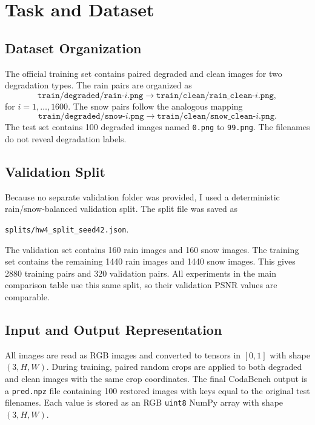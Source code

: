 \documentclass[10pt,conference]{article}
\begin{document}
\section{Task and Dataset}

\subsection{Dataset Organization}

The official training set contains paired degraded and clean images for two degradation types. The rain pairs are organized as
\begin{equation}
    \texttt{train/degraded/rain-}i\texttt{.png} \rightarrow \texttt{train/clean/rain\_clean-}i\texttt{.png},
\end{equation}
for $i=1,\ldots,1600$. The snow pairs follow the analogous mapping
\begin{equation}
    \texttt{train/degraded/snow-}i\texttt{.png} \rightarrow \texttt{train/clean/snow\_clean-}i\texttt{.png}.
\end{equation}
The test set contains 100 degraded images named \texttt{0.png} to \texttt{99.png}. The filenames do not reveal degradation labels.

\subsection{Validation Split}

Because no separate validation folder was provided, I used a deterministic rain/snow-balanced validation split. The split file was saved as
\begin{center}
\texttt{splits/hw4\_split\_seed42.json}.
\end{center}
The validation set contains 160 rain images and 160 snow images. The training set contains the remaining 1440 rain images and 1440 snow images. This gives 2880 training pairs and 320 validation pairs. All experiments in the main comparison table use this same split, so their validation PSNR values are comparable.

\subsection{Input and Output Representation}

All images are read as RGB images and converted to tensors in $[0,1]$ with shape $(3,H,W)$. During training, paired random crops are applied to both degraded and clean images with the same crop coordinates. The final CodaBench output is a \texttt{pred.npz} file containing 100 restored images with keys equal to the original test filenames. Each value is stored as an RGB \texttt{uint8} NumPy array with shape $(3,H,W)$.
\end{document}
